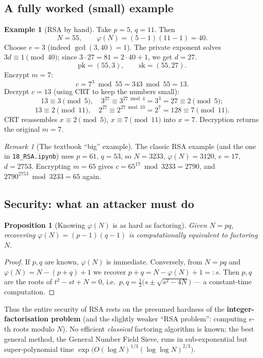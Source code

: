 \documentclass[11pt]{article}
\theoremstyle{plain}
\newtheorem{proposition}[theorem]{Proposition}
\theoremstyle{definition}
\newtheorem{example}[theorem]{Example}
\theoremstyle{remark}
\newtheorem{remark}[theorem]{Remark}
\begin{document}
\subsection{A fully worked (small) example}

\begin{example}[RSA by hand]\label{ex:rsa}
Take $p=5$, $q=11$. Then
\[
  N = 55, \qquad \varphi(N) = (5-1)(11-1) = 40 .
\]
Choose $e=3$ (indeed $\gcd(3,40)=1$). The private exponent solves $3d\equiv 1 \pmod{40}$;
since $3\cdot 27 = 81 = 2\cdot 40 + 1$, we get $d=27$.
\[
  \mathrm{pk}=(55,3),\qquad \mathrm{sk}=(55,27).
\]
Encrypt $m=7$:
\[
  c = 7^{3}\bmod 55 = 343 \bmod 55 = 13 .
\]
Decrypt $c=13$ (using CRT to keep the numbers small):
\[
  13 \equiv 3 \!\!\pmod 5,\quad 3^{27}\equiv 3^{27 \bmod 4}=3^{3}=27\equiv 2\!\!\pmod 5;
\]
\[
  13 \equiv 2 \!\!\pmod{11},\quad 2^{27}\equiv 2^{27 \bmod 10}=2^{7}=128\equiv 7\!\!\pmod{11}.
\]
CRT reassembles $x\equiv 2 \pmod 5$, $x\equiv 7 \pmod{11}$ into $x=7$. Decryption
returns the original $m=7$. \checkmark
\end{example}

\begin{remark}[The textbook ``big'' example]
The classic RSA example (and the one in \texttt{18\_RSA.ipynb}) uses $p=61$, $q=53$,
so $N=3233$, $\varphi(N)=3120$, $e=17$, $d=2753$. Encrypting $m=65$ gives
$c=65^{17}\bmod 3233 = 2790$, and $2790^{2753}\bmod 3233 = 65$ again.
\end{remark}

\subsection{Security: what an attacker must do}

\begin{proposition}[Knowing $\varphi(N)$ is as hard as factoring]\label{prop:phi-fact}
Given $N=pq$, recovering $\varphi(N)=(p-1)(q-1)$ is computationally equivalent to
factoring $N$.
\end{proposition}

\begin{proof}
If $p,q$ are known, $\varphi(N)$ is immediate. Conversely, from $N=pq$ and
$\varphi(N)=N-(p+q)+1$ we recover $p+q=N-\varphi(N)+1=:s$. Then $p,q$ are the roots of
$t^{2}-st+N=0$, i.e.\ $p,q=\tfrac12\bigl(s\pm\sqrt{s^{2}-4N}\bigr)$ --- a constant-time
computation. \end{proof}

Thus the entire security of RSA rests on the presumed hardness of the
\textbf{integer-factorisation problem} (and the slightly weaker ``RSA problem'':
computing $e$-th roots modulo $N$). No efficient \emph{classical} factoring algorithm
is known; the best general method, the General Number Field Sieve, runs in
sub-exponential but super-polynomial time $\exp\!\big(O(\log N)^{1/3}(\log\log N)^{2/3}\big)$.
\end{document}

